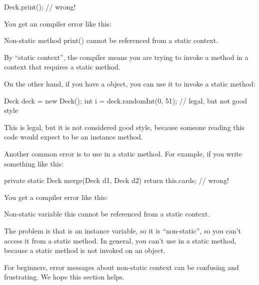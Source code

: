 \begin{code}
Deck.print();  // wrong!
\end{code}



You get an compiler error like this:

\begin{code}
Non-static method print() cannot be referenced from a static context.
\end{code}

By ``static context'', the compiler means you are trying to invoke a method in a context that requires a static method.

On the other hand, if you have a  object, you can use it to invoke a static method:

\begin{code}
Deck deck = new Deck();
int i = deck.randomInt(0, 51);  // legal, but not good style
\end{code}

This is legal, but it is not considered good style, because someone reading this code would expect  to be an instance method.

Another common error is to use  in a static method.
For example, if you write something like this:

\begin{code}
private static Deck merge(Deck d1, Deck d2) {
    return this.cards;  // wrong!
}
\end{code}

You get a compiler error like this:

\begin{code}
Non-static variable this cannot be referenced from a static context.
\end{code}

The problem is that  is an instance variable, so it is ``non-static'', so you can't access it from a static method.
In general, you can't use  in a static method, because a static method is not invoked on an object.

For beginners, error messages about non-static context can be confusing and frustrating.
We hope this section helps.


%


